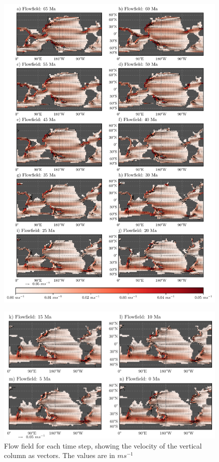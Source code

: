 \documentclass[a4paper]{article}
\begin{document}
\begin{figure}[H]
\includegraphics[width=\linewidth]{flowfield_1.pdf}
\end{figure}
\begin{figure}[H]
\includegraphics[width=\linewidth]{flowfield_2.pdf}
\caption{Flow field for each time step, showing the velocity of the vertical column as vectors. The values are in $m s^{-1}$}
\label{fig:flowfield}
\end{figure}
\end{document}
